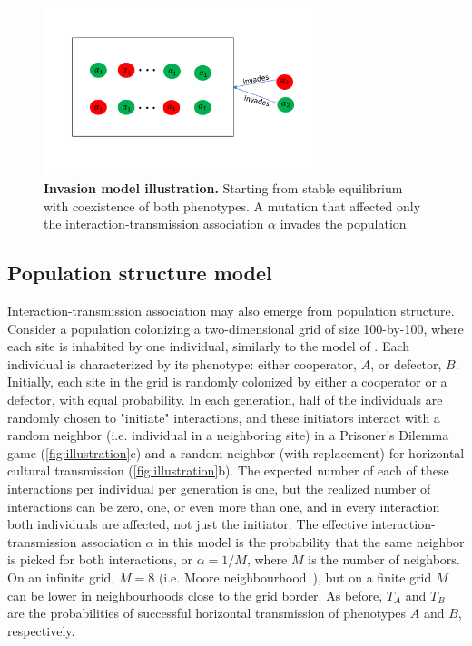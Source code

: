 \documentclass[12pt]{extarticle}
\begin{document}
\begin{figure}[pt]
  \centering
  \includegraphics[width=0.7\textwidth]{../PRSB_figures/fig_2.pdf}
  \caption{\textbf{Invasion model illustration.} Starting from stable equilibrium with coexistence of both phenotypes. 
  A mutation that affected only the interaction-transmission association $\alpha$ invades the population }
  \label{fig:invasion_illustration}
\end{figure}

\newpage
\subsection{Population structure model}
\label{sec:spatialModel}
Interaction-transmission association may also emerge from population structure.
Consider a  population colonizing a two-dimensional grid of size 100-by-100, where each site is inhabited by one individual, similarly to the model of \citet{lewin2020rockpaperscissors}.
Each individual is characterized by its phenotype: either cooperator, $A$, or defector, $B$.
Initially, each site in the grid is randomly colonized by either a cooperator or a defector, with equal probability.
In each generation, half of the individuals are randomly chosen to "initiate" interactions, and these
initiators interact with a random neighbor (i.e. individual in a neighboring site) in a Prisoner's Dilemma game (\autoref{fig:illustration}c) and a random neighbor (with replacement) for horizontal cultural transmission (\autoref{fig:illustration}b).
The expected number of each of these interactions per individual per generation is one, but the realized number of interactions can be zero, one, or even more than one, and in every interaction both individuals are affected, not just the initiator.
The effective interaction-transmission association $\alpha$ in this model is the probability that the same neighbor is picked for both interactions, or $\alpha=1/M$, where $M$ is the number of neighbors.
On an infinite grid, $M=8$ (i.e. Moore neighbourhood~\citep{moore1962machine}), but on a finite grid $M$ can be lower in neighbourhoods close to the grid border.
As before, $T_A$ and $T_B$ are the probabilities of successful horizontal transmission of phenotypes $A$ and $B$, respectively.
\end{document}
